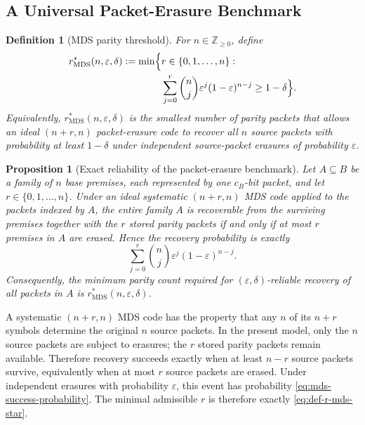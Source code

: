 \documentclass[journal]{IEEEtran}
\makeatletter
\newtheorem{proposition}{Proposition}[section]
\newtheorem{definition}{Definition}[section]
\numberwithin{equation}{section}
\renewenvironment{proof}[1][\proofname]{\par
  \pushQED{\qed}%
  \normalfont \topsep6\p@\@plus6\p@\relax
  \trivlist
  \item[\hskip\labelsep
        \itshape
    #1\@addpunct{.}]\ignorespaces
}{%
  \popQED\endtrivlist\@endpefalse
}
\makeatother
\begin{document}
\subsection{A Universal Packet-Erasure Benchmark}
\label{subsec:coded-benchmark-model}

\begin{definition}[MDS parity threshold]
\label{def:mds-threshold}
For \(n\in\mathbb Z_{\ge 0}\), define
\begin{equation}
  \begin{aligned}
    r_{\mathrm{MDS}}^*(n,\varepsilon,\delta)
    := \min \Bigl\{ & r\in\{0,1,\ldots,n\}: \\
    & \sum_{j=0}^{r} \binom{n}{j} \varepsilon^{j}(1-\varepsilon)^{n-j} \ge 1-\delta \Bigr\}.
  \end{aligned}
\label{eq:def-r-mds-star}
\end{equation}
Equivalently,
\(r_{\mathrm{MDS}}^*(n,\varepsilon,\delta)\) is the smallest number of parity
packets that allows an ideal \((n+r,n)\) packet-erasure code to recover all
\(n\) source packets with probability at least \(1-\delta\) under independent
source-packet erasures of probability \(\varepsilon\).
\end{definition}

\begin{proposition}[Exact reliability of the packet-erasure benchmark]
\label{prop:mds-reliability}
Let \(A\subseteq B\) be a family of \(n\) base premises, each represented by
one \(c_B\)-bit packet, and let \(r\in\{0,1,\ldots,n\}\).  Under an ideal
systematic \((n+r,n)\) MDS code applied to the packets indexed by \(A\), the
entire family \(A\) is recoverable from the surviving premises together with
the \(r\) stored parity packets if and only if at most \(r\) premises in \(A\)
are erased.  Hence the recovery probability is exactly
\begin{equation}
  \sum_{j=0}^{r}
  \binom{n}{j}
  \varepsilon^{j}(1-\varepsilon)^{n-j}.
\label{eq:mds-success-probability}
\end{equation}
Consequently, the minimum parity count required for
\((\varepsilon,\delta)\)-reliable recovery of all packets in \(A\) is
\(r_{\mathrm{MDS}}^*(n,\varepsilon,\delta)\).
\end{proposition}

\begin{proof}
A systematic \((n+r,n)\) MDS code has the property that any \(n\) of its
\(n+r\) symbols determine the original \(n\) source packets.  In the present
model, only the \(n\) source packets are subject to erasures; the \(r\) stored
parity packets remain available.  Therefore recovery succeeds exactly when at
least \(n-r\) source packets survive, equivalently when at most \(r\) source
packets are erased.  Under independent erasures with probability
\(\varepsilon\), this event has probability \eqref{eq:mds-success-probability}.
The minimal admissible \(r\) is therefore exactly
\eqref{eq:def-r-mds-star}.
\end{proof}
\end{document}
